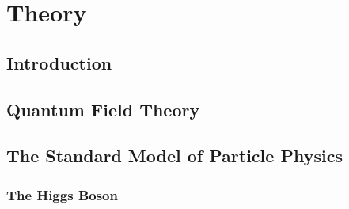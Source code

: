 \chapter{Theory}

\section{Introduction} \label{sec:theory_intro}


\section{Quantum Field Theory} \label{sec:theory_qft}


\section{The Standard Model of Particle Physics} \label{sec:theory_sm}


\subsection{The Higgs Boson} \label{sec:theory_higgs}


%

